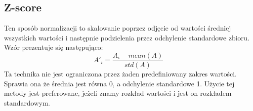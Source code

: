 \subsection{Z-score}
Ten sposób normalizacji to skalowanie poprzez odjęcie od wartości średniej wszystkich wartości i następnie podzielenia przez odchylenie standardowe zbioru. Wzór prezentuje się następująco:
\begin{equation}
\label{eqn:minmax}
A'_i = \frac{A_i-mean(A)}{std(A)}
\end{equation}
Ta technika nie jest ograniczona przez żaden predefiniowany zakres wartości. Sprawia ona że średnia jest równa 0, a odchylenie standardowe 1. Użycie tej metody jest preferowane, jeżeli znamy rozkład wartości i jest on rozkładem standardowym.